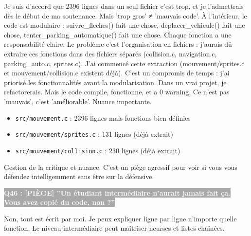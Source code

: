 \documentclass[12pt,a4paper]{article}
\newcommand{\question}[1]{%
    \vspace{0.5cm}
    \noindent\colorbox{darkgray}{\textcolor{white}{\textbf{#1}}}
    \vspace{0.3cm}
}
\begin{document}
\begin{reponse_longue}
Je suis d'accord que 2396 lignes dans un seul fichier c'est trop, et je l'admettrais dès le début de ma soutenance. Mais 'trop gros' ≠ 'mauvais code'. À l'intérieur, le code est modulaire : suivre\_fleches() fait une chose, deplacer\_vehicule() fait une chose, tenter\_parking\_automatique() fait une chose. Chaque fonction a une responsabilité claire. Le problème c'est l'organisation en fichiers : j'aurais dû extraire ces fonctions dans des fichiers séparés (collision.c, navigation.c, parking\_auto.c, sprites.c). J'ai commencé cette extraction (mouvement/sprites.c et mouvement/collision.c existent déjà). C'est un compromis de temps : j'ai priorisé les fonctionnalités avant la modularisation. Dans un vrai projet, je refactorerais. Mais le code compile, fonctionne, et a 0 warning. Ce n'est pas 'mauvais', c'est 'améliorable'. Nuance importante.
\end{reponse_longue}

\begin{reference_code}
\begin{itemize}
    \item \texttt{src/mouvement.c} : 2396 lignes mais fonctions bien définies
    \item \texttt{src/mouvement/sprites.c} : 131 lignes (déjà extrait)
    \item \texttt{src/mouvement/collision.c} : 230 lignes (déjà extrait)
\end{itemize}
\end{reference_code}

\begin{objectif_prof}
Gestion de la critique et nuance. C'est un piège agressif pour voir si vous vous défendez intelligemment sans être sur la défensive.
\end{objectif_prof}

\question{Q46 : [PIÈGE] ''Un étudiant intermédiaire n'aurait jamais fait ça. Vous avez copié du code, non ?''}

\begin{reponse_courte}
Non, tout est écrit par moi. Je peux expliquer ligne par ligne n'importe quelle fonction. Le niveau intermédiaire peut maîtriser ncurses et listes chaînées.
\end{reponse_courte}
\end{document}
